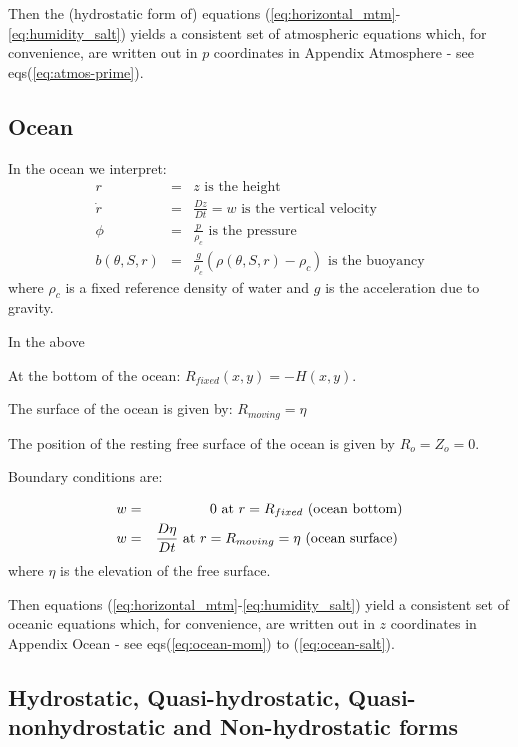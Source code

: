 Then the (hydrostatic form of) equations (\ref{eq:horizontal_mtm}-\ref{eq:humidity_salt}) 
yields a consistent set of atmospheric equations which, for convenience, are written out in $p$
coordinates in Appendix Atmosphere - see eqs(\ref{eq:atmos-prime}).

\subsection{Ocean}

In the ocean we interpret: 
\begin{eqnarray}
r &=&z\text{ is the height}  \label{eq:ocean-z} \\
\dot{r} &=&\frac{Dz}{Dt}=w\text{ is the vertical velocity}
\label{eq:ocean-w} \\
\phi &=&\frac{p}{\rho _{c}}\text{ is the pressure}  \label{eq:ocean-p} \\
b(\theta ,S,r) &=&\frac{g}{\rho _{c}}\left( \rho (\theta ,S,r)-\rho
_{c}\right) \text{ is the buoyancy}  \label{eq:ocean-b}
\end{eqnarray}
where $\rho _{c}$ is a fixed reference density of water and $g$ is the
acceleration due to gravity.\noindent

In the above

At the bottom of the ocean: $R_{fixed}(x,y)=-H(x,y)$.

The surface of the ocean is given by: $R_{moving}=\eta $

The position of the resting free surface of the ocean is given by $
R_{o}=Z_{o}=0$.

Boundary conditions are:

\begin{eqnarray}
w &=&0~\text{at }r=R_{fixed}\text{ (ocean bottom)}  \label{eq:fixed-bc-ocean}
\\
w &=&\frac{D\eta }{Dt}\text{ at }r=R_{moving}=\eta \text{ (ocean surface) 
\label{eq:moving-bc-ocean}}
\end{eqnarray}
where $\eta $ is the elevation of the free surface.

Then equations (\ref{eq:horizontal_mtm}-\ref{eq:humidity_salt}) yield a consistent set 
of oceanic equations
which, for convenience, are written out in $z$ coordinates in Appendix Ocean
- see eqs(\ref{eq:ocean-mom}) to (\ref{eq:ocean-salt}).

\subsection{Hydrostatic, Quasi-hydrostatic, Quasi-nonhydrostatic and
Non-hydrostatic forms}

